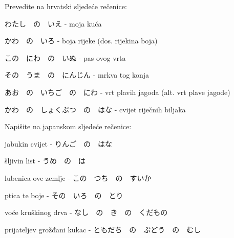 
\author{Katja Kržišnik, Marko Barbančić}

	
	\begin{mondai}{Prevedite na hrvatski sljedeće rečenice:}
		\item わたし　の　いえ - moja kuća
		\item かわ　の　いろ - boja rijeke (dos. rijekina boja)

		\item この　にわ　の　いぬ - pas ovog vrta
		\item その　うま　の　にんじん - mrkva tog konja

		\item あお　の　いちご　の　にわ - vrt plavih jagoda (alt. vrt plave jagode)
		\item かわ　の　しょくぶつ　の　はな - cvijet riječnih biljaka
	\end{mondai}
	
	\begin{mondai}{Napišite na japanskom sljedeće rečenice:}
		\item jabukin cvijet - りんご　の　はな
		\item šljivin list - うめ　の　は

		\item lubenica ove zemlje - この　つち　の　すいか
		\item ptica te boje - その　いろ　の　とり

		\item voće kruškinog drva - なし　の　き　の　くだもの
		\item prijateljev grožđani kukac - ともだち　の　ぶどう　の　むし
	\end{mondai}

